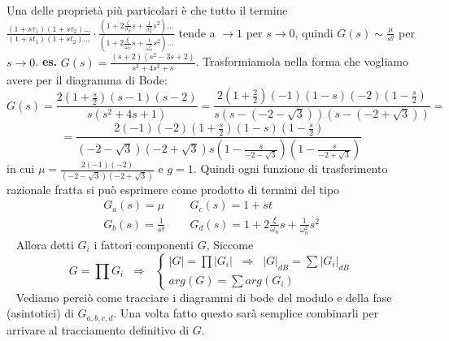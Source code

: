 \newline
Una delle proprietà più particolari è che tutto il termine $\frac{(1 + s \tau_1)(1 + s \tau_2)\dots}{(1 + s t_1)(1 + s t_2)\dots} \cdot \frac{(1 + 2 \frac{\zeta}{\sigma_n}s + \frac{1}{\sigma_n^2}s^2)\dots}{(1 + 2 \frac{\xi}{\omega_n} s + \frac{1}{\omega_n^2}s^2)\dots}$ tende a $\rightarrow  1$ per $s \rightarrow 0$, quindi $G(s) \sim \frac{\mu}{s^g}$ per $s \rightarrow  0$.\newline
\newline
\textbf{es.} $G(s) = \frac{(s+2)(s^2-3s+2)}{s^3 + 4 s^2 + s}$.\newline
Trasformiamola nella forma che vogliamo avere per il diagramma di Bode:
\[
    G(s) = \frac{2(1+\frac{s}{2})(s-1)(s-2)}{s(s^2+4s+1)} = \frac{2(1+ \frac{2}{2})(-1)(1-s)(-2)(1-\frac{s}{2})}{s(s-(-2-\sqrt{3}))(s-(-2+\sqrt{3}))}=
\]
\[
    = \frac{2(-1)(-2)(1+\frac{s}{2})(1-s)(1-\frac{s}{2})}{(-2-\sqrt{3})(-2+\sqrt{3})s(1-\frac{s}{-2-\sqrt{3}})(1-\frac{s}{-2+\sqrt{3}})}
\]
in cui $\mu= \frac{2(-1)(-2)}{(-2-\sqrt{3})(-2+\sqrt{3})}$ e $g=1$.\newline
\newline
\newline
Quindi ogni funzione di trasferimento razionale fratta si può esprimere come prodotto di termini del tipo 
\[
    \begin{matrix}
        G_a(s) = \mu & \;\; & G_c(s) = 1+ s t\\
        G_b(s) = \frac{1}{s^g} & \;\; & G_d(s) = 1 + 2 \frac{\xi}{\omega_n}s + \frac{1}{\omega_n^2}s^2
    \end{matrix}
\]
\ \newline
\newline
Allora detti $G_i$ i fattori componenti $G$, Siccome
\[
    G=\prod G_i \;\; \Longrightarrow \;\; \begin{cases}
        |G| = \prod |G_i| \;\; \Longrightarrow \;\; |G|_{dB} = \sum |G_i|_{dB}\\
        arg(G) = \sum arg(G_i)
    \end{cases}
\]
\ \newline
\newline
Vediamo perciò come tracciare i diagrammi di bode del modulo e della fase (asintotici) di $G_{a,b,c,d}$. Una volta fatto questo sarà semplice combinarli per arrivare al tracciamento definitivo di $G$.
